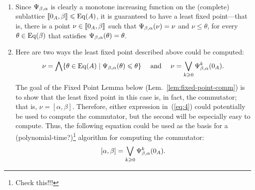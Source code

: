 \begin{remarks}\
  \begin{enumerate}
  \item 
  Since $\Psi_{\beta, \alpha}$ is clearly a monotone increasing function on the (complete) sublattice
  $\llbracket 0_A, \beta\rrbracket \leqslant \operatorname{Eq}(A)$, it is guaranteed to have a least fixed
  point---that is, there is a point $\nu\in \llbracket 0_A, \beta\rrbracket$ such that $\Psi_{\beta, \alpha}(\nu) = \nu$
  and $\nu \leq \theta$, for every $\theta\in \operatorname{Eq}(\beta)$
  that satisfies $\Psi_{\beta, \alpha}(\theta) = \theta$.
\item
  Here are two ways the least fixed point described above could be computed:
  \begin{equation}
    \label{eq:4}
  \nu = \bigwedge \{ \theta \in \operatorname{Eq}(A) \mid \Psi_{\beta, \alpha}(\theta) \leqslant \theta\}
  \quad \text{ and } \quad
     \nu = \bigvee_{k\geqslant 0} \Psi_{\beta, \alpha}^{k}(0_A).
  \end{equation}
  The goal of the Fixed Point Lemma below (Lem.~\ref{lem:fixed-point-comm})
  is to show that the least
  fixed point in this case is, in fact, the commutator;
  that is, $\nu = [\alpha, \beta]$.  Therefore, either
  expression in~(\ref{eq:4}) could potentially be used to compute the
  commutator, but the second will be especially easy to
  compute.  Thus, the following equation could be used as the basis for a
  (polynomial-time?)\footnote{Check this!!!} algorithm for computing the commutator:
  \[
  [\alpha, \beta] = \bigvee_{k\geqslant 0} \Psi_{\beta, \alpha}^{k}(0_A).
  \]
  \end{enumerate}

\end{remarks}


